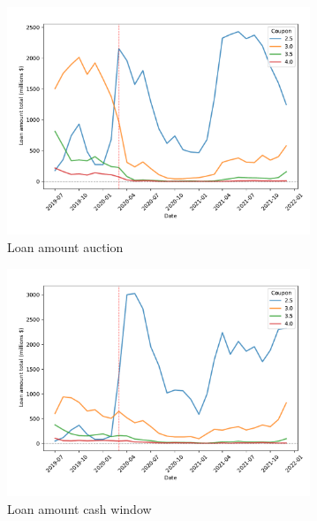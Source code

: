 \documentclass[11pt,a4paper]{article}
\begin{document}
\begin{figure}[]
  \centering
     \begin{subfigure}[b]{0.49\textwidth}
      \includegraphics[width=0.998\textwidth]{../results/figures/LoanAmount_sum_mat30_loan1_timeseries_cpmonthly_2.5_4_auction.pdf}
      \caption{Loan amount auction}
     \end{subfigure}
      \begin{subfigure}[b]{0.49\textwidth}
        \includegraphics[width=0.998\textwidth]{../results/figures/LoanAmount_sum_mat30_loan1_timeseries_cpmonthly_2.5_4_cash_window.pdf}
        \caption{Loan amount cash window}
        \end{subfigure}
     \begin{subfigure}[b]{0.49\textwidth}

\end{subfigure}
\end{figure}
\end{document}
